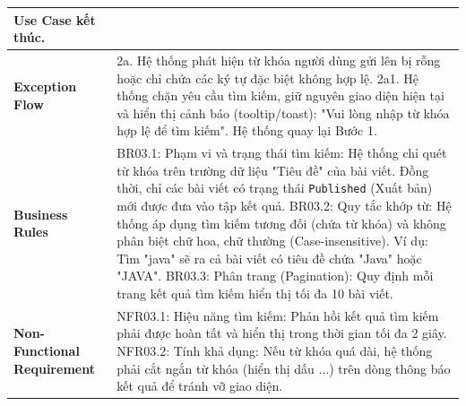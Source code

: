 \documentclass[a4paper,12pt]{article}
\begin{document}
\begin{longtable}{|p{4cm}|p{11.5cm}|}
Use Case kết thúc. \\ \hline
\textbf{Exception Flow} & 
2a. Hệ thống phát hiện từ khóa người dùng gửi lên bị rỗng hoặc chỉ chứa các ký tự đặc biệt không hợp lệ. \newline
2a1. Hệ thống chặn yêu cầu tìm kiếm, giữ nguyên giao diện hiện tại và hiển thị cảnh báo (tooltip/toast): "Vui lòng nhập từ khóa hợp lệ để tìm kiếm". \newline
Hệ thống quay lại Bước 1. \\ \hline
\textbf{Business Rules} & 
BR03.1: Phạm vi và trạng thái tìm kiếm: Hệ thống chỉ quét từ khóa trên trường dữ liệu "Tiêu đề" của bài viết. Đồng thời, chỉ các bài viết có trạng thái \texttt{Published} (Xuất bản) mới được đưa vào tập kết quả. \newline
BR03.2: Quy tắc khớp từ: Hệ thống áp dụng tìm kiếm tương đối (chứa từ khóa) và không phân biệt chữ hoa, chữ thường (Case-insensitive). Ví dụ: Tìm "java" sẽ ra cả bài viết có tiêu đề chứa "Java" hoặc "JAVA". \newline
BR03.3: Phân trang (Pagination): Quy định mỗi trang kết quả tìm kiếm hiển thị tối đa 10 bài viết. \\ \hline
\textbf{Non-Functional Requirement} & 
NFR03.1: Hiệu năng tìm kiếm: Phản hồi kết quả tìm kiếm phải được hoàn tất và hiển thị trong thời gian tối đa 2 giây. \newline
NFR03.2: Tính khả dụng: Nếu từ khóa quá dài, hệ thống phải cắt ngắn từ khóa (hiển thị dấu ...) trên dòng thông báo kết quả để tránh vỡ giao diện. \\ \hline
\end{longtable}
\end{document}
